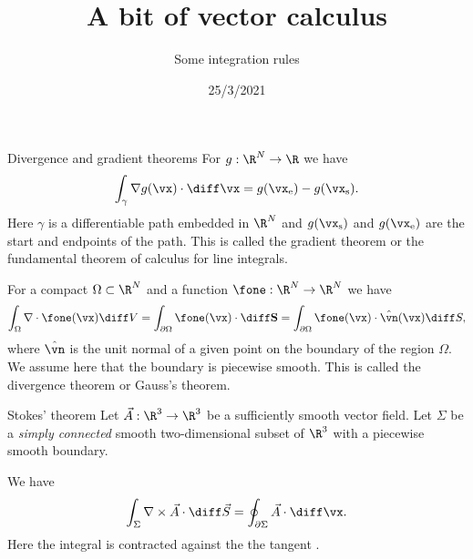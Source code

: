 

\title{A bit of vector calculus}
\subtitle{Some integration rules}
\date{25/3/2021}
\date{}


	
	\maketitle
	

\begin{frame}{Divergence and gradient theorems}
	For $ g: \R^N \to \R $ we have 
	\[ \int_{\gamma} \nabla g(\vx) \cdot \diff \vx = g(\vx_{\text{e}})-g(\vx_{\text{s}}). \]
	Here $ \gamma $ is a differentiable path embedded in $ \R^N $ and $ g(\vx_{\text{s}}) $ and $ g(\vx_{\text{e}}) $ are the start and endpoints of the path. This is called the \alert{gradient theorem} or the fundamental theorem of calculus for line integrals.
	
	\pause
	For a compact $ \Omega \subset \R^N $ and a function $ \fone : \R^N \to \R^N $ we have
	\[ \int_{\Omega} \nabla \cdot \fone(\vx) \diff V = \int_{\partial \Omega } \fone(\vx) \cdot \diff \mathbf{S} = \int_{\partial \Omega } \fone(\vx) \cdot \hat{\vn}(\vx) \diff S, \]
	where $ \hat{\vn} $ is the unit normal of a given point on the boundary of the region $ \Omega $. We assume here that the boundary is piecewise smooth. This is called the \alert{divergence theorem} or Gauss's theorem.
\end{frame}

\begin{frame}{Stokes' theorem}
	Let $ \vec{A}: \R^3 \to \R^3 $ be a sufficiently smooth vector field. Let $ \Sigma $ be a \emph{simply connected} smooth two-dimensional subset of $ \R^3 $ with a piecewise smooth boundary. 
	
	\pause
	We have
	\[ \int_{\Sigma} \nabla \times \vec{A} \cdot \diff \vec{S} = \oint_{\partial \Sigma} \vec{A} \cdot \diff \vx. \]
	Here the integral is contracted against the the tangent . 
\end{frame}

